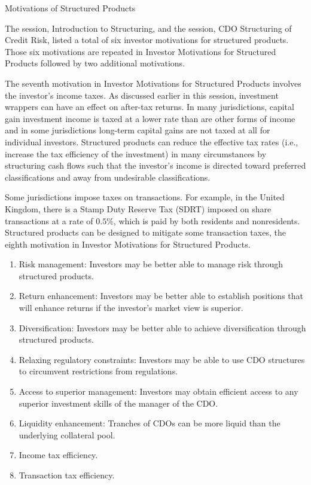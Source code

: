 \documentclass[11pt]{article}
\begin{document}
Motivations of Structured Products

The session, Introduction to Structuring, and the session, CDO Structuring of Credit Risk, listed a total of six investor motivations for structured products. Those six motivations are repeated in Investor Motivations for Structured Products followed by two additional motivations.

The seventh motivation in Investor Motivations for Structured Products involves the investor's income taxes. As discussed earlier in this session, investment wrappers can have an effect on after-tax returns. In many jurisdictions, capital gain investment income is taxed at a lower rate than are other forms of income and in some jurisdictions long-term capital gains are not taxed at all for individual investors. Structured products can reduce the effective tax rates (i.e., increase the tax efficiency of the investment) in many circumstances by structuring cash flows such that the investor's income is directed toward preferred classifications and away from undesirable classifications.

Some jurisdictions impose taxes on transactions. For example, in the United Kingdom, there is a Stamp Duty Reserve Tax (SDRT) imposed on share transactions at a rate of $0.5 \%$, which is paid by both residents and nonresidents. Structured products can be designed to mitigate some transaction taxes, the eighth motivation in Investor Motivations for Structured Products.

\begin{enumerate}
  \item Risk management: Investors may be better able to manage risk through structured products.

  \item Return enhancement: Investors may be better able to establish positions that will enhance returns if the investor's market view is superior.

  \item Diversification: Investors may be better able to achieve diversification through structured products.

  \item Relaxing regulatory constraints: Investors may be able to use CDO structures to circumvent restrictions from regulations.

  \item Access to superior management: Investors may obtain efficient access to any superior investment skills of the manager of the CDO.

  \item Liquidity enhancement: Tranches of CDOs can be more liquid than the underlying collateral pool.

  \item Income tax efficiency.

  \item Transaction tax efficiency.

\end{enumerate}
\end{document}
